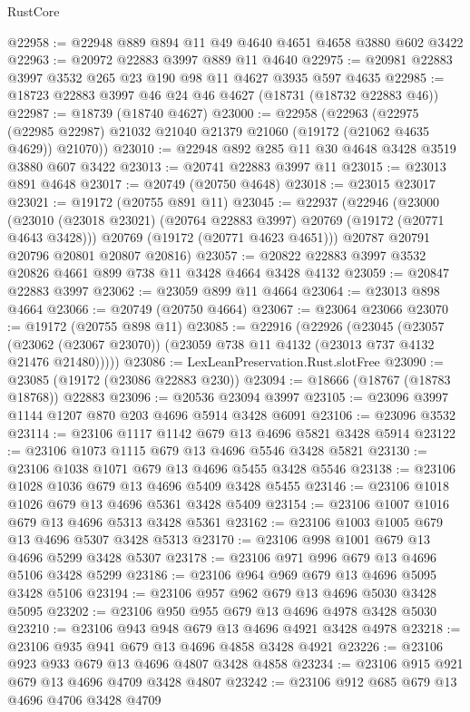 \begin{lexlean}{RustCore}
\begin{coremodule}
@22958 := @22948 @889 @894 @11 @49 @4640 @4651 @4658 @3880 @602 @3422
@22963 := @20972 @22883 @3997 @889 @11 @4640
@22975 := @20981 @22883 @3997 @3532 @265 @23 @190 @98 @11 @4627 @3935 @597 @4635
@22985 := @18723 @22883 @3997 @46 @24 @46 @4627 (@18731 (@18732 @22883 @46))
@22987 := @18739 (@18740 @4627)
@23000 := @22958
    (@22963
      (@22975 (@22985 @22987) @21032 @21040 @21379 @21060 (@19172 (@21062 @4635 @4629)) @21070))
@23010 := @22948 @892 @285 @11 @30 @4648 @3428 @3519 @3880 @607 @3422
@23013 := @20741 @22883 @3997 @11
@23015 := @23013 @891 @4648
@23017 := @20749 (@20750 @4648)
@23018 := @23015 @23017
@23021 := @19172 (@20755 @891 @11)
@23045 := @22937
    (@22946
      (@23000
        (@23010 (@23018 @23021) (@20764 @22883 @3997) @20769 (@19172 (@20771 @4643 @3428)))
        @20769
        (@19172 (@20771 @4623 @4651)))
      @20787
      @20791
      @20796
      @20801
      @20807
      @20816)
@23057 := @20822 @22883 @3997 @3532 @20826 @4661 @899 @738 @11 @3428 @4664 @3428 @4132
@23059 := @20847 @22883 @3997
@23062 := @23059 @899 @11 @4664
@23064 := @23013 @898 @4664
@23066 := @20749 (@20750 @4664)
@23067 := @23064 @23066
@23070 := @19172 (@20755 @898 @11)
@23085 := @22916
    (@22926
      (@23045
        (@23057
          (@23062 (@23067 @23070))
          (@23059 @738 @11 @4132 (@23013 @737 @4132 @21476 @21480)))))
@23086 := LexLeanPreservation.Rust.slotFree
@23090 := @23085 (@19172 (@23086 @22883 @230))
@23094 := @18666 (@18767 (@18783 @18768)) @22883
@23096 := @20536 @23094 @3997
@23105 := @23096 @3997 @1144 @1207 @870 @203 @4696 @5914 @3428 @6091
@23106 := @23096 @3532
@23114 := @23106 @1117 @1142 @679 @13 @4696 @5821 @3428 @5914
@23122 := @23106 @1073 @1115 @679 @13 @4696 @5546 @3428 @5821
@23130 := @23106 @1038 @1071 @679 @13 @4696 @5455 @3428 @5546
@23138 := @23106 @1028 @1036 @679 @13 @4696 @5409 @3428 @5455
@23146 := @23106 @1018 @1026 @679 @13 @4696 @5361 @3428 @5409
@23154 := @23106 @1007 @1016 @679 @13 @4696 @5313 @3428 @5361
@23162 := @23106 @1003 @1005 @679 @13 @4696 @5307 @3428 @5313
@23170 := @23106 @998 @1001 @679 @13 @4696 @5299 @3428 @5307
@23178 := @23106 @971 @996 @679 @13 @4696 @5106 @3428 @5299
@23186 := @23106 @964 @969 @679 @13 @4696 @5095 @3428 @5106
@23194 := @23106 @957 @962 @679 @13 @4696 @5030 @3428 @5095
@23202 := @23106 @950 @955 @679 @13 @4696 @4978 @3428 @5030
@23210 := @23106 @943 @948 @679 @13 @4696 @4921 @3428 @4978
@23218 := @23106 @935 @941 @679 @13 @4696 @4858 @3428 @4921
@23226 := @23106 @923 @933 @679 @13 @4696 @4807 @3428 @4858
@23234 := @23106 @915 @921 @679 @13 @4696 @4709 @3428 @4807
@23242 := @23106 @912 @685 @679 @13 @4696 @4706 @3428 @4709

\end{coremodule}
\end{lexlean}
